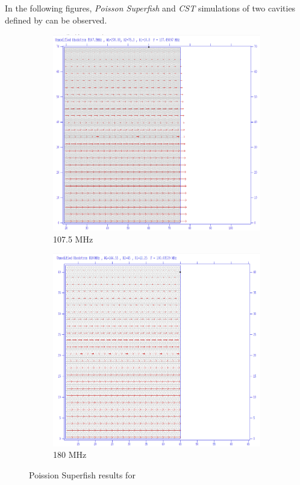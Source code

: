 \documentclass[a4paper,oneside,12pt]{report}
\numberwithin{equation}{chapter}
\begin{document}
In the following figures, \textit{Poisson Superfish} and \textit{CST} simulations of two cavities defined by  can be observed.

\begin{figure}[H]
    \centering
    \begin{subfigure}{.5\textwidth}
      \centering
      \includegraphics[width=\linewidth]{./figures/superfish/superfish107.png}
      \caption{107.5 MHz}
    \end{subfigure}%
    \centering
    \begin{subfigure}{.5\textwidth}
      \centering
      \includegraphics[width=\linewidth]{./figures/superfish/superfish180.png}
      \caption{180 MHz}
    \end{subfigure}
    \caption{Poission Superfish results for }
    \label{fig:107_simple_cavity_design}
\end{figure}
\end{document}

